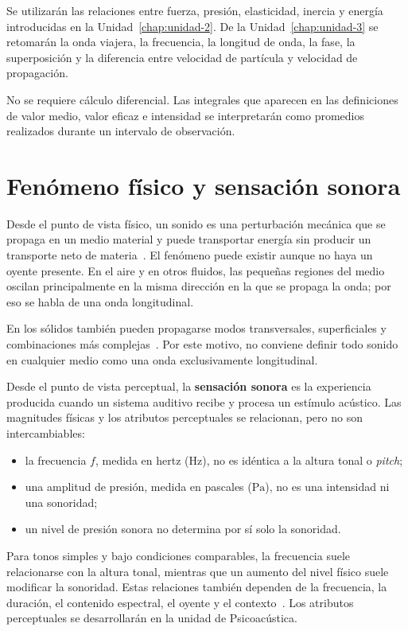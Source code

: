 Se utilizarán las relaciones entre fuerza, presión, elasticidad, inercia y
energía introducidas en la Unidad~\ref{chap:unidad-2}. De la
Unidad~\ref{chap:unidad-3} se retomarán la onda viajera, la frecuencia, la
longitud de onda, la fase, la superposición y la diferencia entre velocidad de
partícula y velocidad de propagación.

No se requiere cálculo diferencial. Las integrales que aparecen en las
definiciones de valor medio, valor eficaz e intensidad se interpretarán como
promedios realizados durante un intervalo de observación.

\section{Fenómeno físico y sensación sonora}
\label{sec:u4-fenomeno-percepcion}

Desde el punto de vista físico, un sonido es una perturbación mecánica
que se propaga en un medio material y puede transportar energía sin producir
un transporte neto de materia~\cite{xiangBlauert2021}. El fenómeno puede existir aunque no haya un
oyente presente. En el aire y en otros fluidos, las pequeñas regiones del
medio oscilan principalmente en la misma dirección en la que se propaga la
onda; por eso se habla de una onda longitudinal.

En los sólidos también pueden propagarse modos transversales,
superficiales y combinaciones más complejas~\cite{xiangBlauert2021}. Por este motivo, no conviene
definir todo sonido en cualquier medio como una onda exclusivamente
longitudinal.

Desde el punto de vista perceptual, la \textbf{sensación sonora} es la
experiencia producida cuando un sistema auditivo recibe y procesa un estímulo
acústico. Las magnitudes físicas y los atributos perceptuales se relacionan,
pero no son intercambiables:

\begin{itemize}
    \item la frecuencia \(f\), medida en hertz (\(\text{Hz}\)), no es idéntica
    a la altura tonal o \emph{pitch};
    \item una amplitud de presión, medida en pascales (\(\text{Pa}\)), no es
    una intensidad ni una sonoridad;
    \item un nivel de presión sonora no determina por sí solo la sonoridad.
\end{itemize}

Para tonos simples y bajo condiciones comparables, la frecuencia suele
relacionarse con la altura tonal, mientras que un aumento del nivel físico
suele modificar la sonoridad. Estas relaciones también dependen de la
frecuencia, la duración, el contenido espectral, el oyente y el contexto~\cite{xiangBlauert2021}. Los
atributos perceptuales se desarrollarán en la unidad de Psicoacústica.

